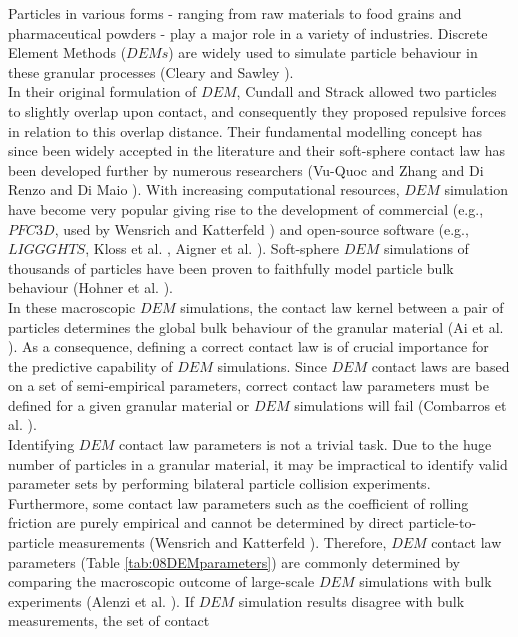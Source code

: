 \documentclass{llncs}
\begin{document}
Particles in various forms - ranging from raw materials to food grains and pharmaceutical powders - 
play a major role in a variety of industries. 
Discrete Element Methods ($DEMs$) are widely used to simulate
particle behaviour in these granular processes (Cleary and Sawley \cite{RefWorks:130}).\\
In their original formulation of $DEM$, Cundall and Strack \cite{RefWorks:172} allowed two 
particles to slightly overlap upon contact, and consequently they proposed
repulsive forces in relation to this overlap distance.
Their fundamental modelling concept has since been widely accepted in the
literature and their soft-sphere contact law has been developed further by
numerous researchers (Vu-Quoc and Zhang \cite{RefWorks:148} and Di Renzo and Di Maio \cite{RefWorks:145}). 
With increasing computational resources, $DEM$ simulation have become very
popular giving rise to the development of commercial (e.g., $PFC3D$, used by
Wensrich and Katterfeld \cite{RefWorks:87}) and open-source software (e.g.,
$LIGGGHTS$, Kloss et al. \cite{RefWorks:136}, Aigner et al. \cite{RefWorks:139}).
Soft-sphere $DEM$ simulations of thousands of particles have been proven to 
faithfully model particle bulk behaviour (Hohner et al. \cite{RefWorks:86}). \\
In these macroscopic $DEM$ simulations, the contact law kernel between a 
pair of particles determines the global bulk behaviour of the granular material (Ai et al. \cite{RefWorks:131}). 
As a consequence, defining a correct contact law is of crucial importance for the predictive 
capability of $DEM$ simulations. 
Since $DEM$ contact laws are based 
on a set of semi-empirical parameters, correct contact law 
parameters must be defined for a given granular material
or $DEM$ simulations will fail (Combarros et al. \cite{RefWorks:177}). \\
Identifying $DEM$ contact law parameters is not a trivial task. 
Due to the huge number of particles in a granular material, it
may be impractical to identify valid parameter sets by performing bilateral 
particle collision experiments. 
Furthermore, some contact law parameters such as the coefficient of rolling
friction are purely empirical and cannot be determined by direct 
particle-to-particle measurements (Wensrich and Katterfeld \cite{RefWorks:87}).
Therefore, $DEM$ contact law parameters (Table \ref{tab:08DEMparameters}) are
commonly determined by comparing the macroscopic outcome of large-scale $DEM$ simulations with 
bulk experiments (Alenzi et al. \cite{RefWorks:91}). 
If $DEM$ simulation results disagree with bulk measurements, the set of contact
\end{document}
